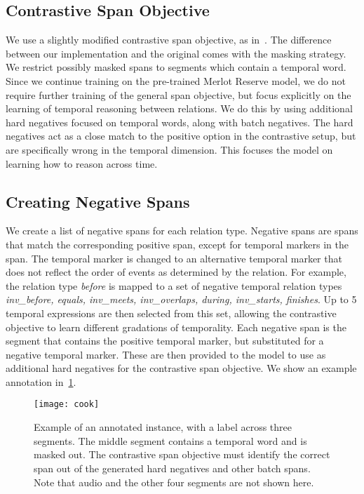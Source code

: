 \subsection{Contrastive Span Objective}
\label{ssec:contr_span}

We use a slightly modified contrastive span objective, as
in~\citet{zellers2022mreserve}. The difference between our implementation and
the original comes with the masking strategy. We restrict possibly masked spans
to segments which contain a temporal word. Since we continue training on the
pre-trained Merlot Reserve model, we do not require further training of the
general span objective, but focus explicitly on the learning of temporal
reasoning between relations. We do this by using additional hard negatives
focused on temporal words, along with batch negatives. The hard negatives act
as a close match to the positive option in the contrastive setup, but are
specifically wrong in the temporal dimension. This focuses the model on
learning how to reason across time.

\subsection{Creating Negative Spans}
\label{ssec:neg_labels}

We create a list of negative spans for each relation type. Negative spans are
spans that match the corresponding positive span, except for temporal markers
in the span. The temporal marker is changed to an alternative temporal marker
that does not reflect the order of events as determined by the relation. For
example, the relation type \textit{before} is mapped to a set of negative
temporal relation types \textit{inv\_before, equals, inv\_meets, inv\_overlaps,
during, inv\_starts, finishes}. Up to 5 temporal expressions are then selected
from this set, allowing the contrastive objective to learn different gradations
of temporality. Each negative span is the segment that contains the positive
temporal marker, but substituted for a negative temporal marker. These are then
provided to the model to use as additional hard negatives for the contrastive
span objective. We show an example annotation in~\cref{fig:hard_neg}.

\begin{figure}[tp]
	\centering
	\texttt{[image: cook]}
	\caption{Example of an annotated instance, with a label across three
	segments. The middle segment contains a temporal word and is masked out.
	The contrastive span objective must identify the correct span out of the
	generated hard negatives and other batch spans. Note that audio and the
	other four segments are not shown here.}
	\label{fig:hard_neg}
\end{figure}


